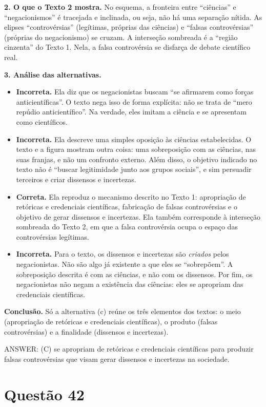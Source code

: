 \documentclass{article}%
\begin{document}
\textbf{2. O que o Texto 2 mostra.} No esquema, a fronteira entre ``ciências'' e ``negacionismos'' é tracejada e inclinada, ou seja, não há uma separação nítida. As elipses ``controvérsias'' (legítimas, próprias das ciências) e ``falsas controvérsias'' (próprias do negacionismo) se cruzam. A interseção sombreada é a ``região cinzenta'' do Texto 1. Nela, a falsa controvérsia se disfarça de debate científico real.

\textbf{3. Análise das alternativas.}
\begin{itemize}
  \item[(a)] \textbf{Incorreta.} Ela diz que os negacionistas buscam ``se afirmarem como forças anticientíficas''. O texto nega isso de forma explícita: não se trata de ``mero repúdio anticientífico''. Na verdade, eles imitam a ciência e se apresentam como científicos.
  \item[(b)] \textbf{Incorreta.} Ela descreve uma simples oposição às ciências estabelecidas. O texto e a figura mostram outra coisa: uma sobreposição com as ciências, nas suas franjas, e não um confronto externo. Além disso, o objetivo indicado no texto não é ``buscar legitimidade junto aos grupos sociais'', e sim persuadir terceiros e criar dissensos e incertezas.
  \item[(c)] \textbf{Correta.} Ela reproduz o mecanismo descrito no Texto 1: apropriação de retóricas e credenciais científicas, fabricação de falsas controvérsias e o objetivo de gerar dissensos e incertezas. Ela também corresponde à interseção sombreada do Texto 2, em que a falsa controvérsia ocupa o espaço das controvérsias legítimas.
  \item[(d)] \textbf{Incorreta.} Para o texto, os dissensos e incertezas são \emph{criados} pelos negacionistas. Não são algo já existente a que eles se ``sobrepõem''. A sobreposição descrita é com as ciências, e não com os dissensos. Por fim, os negacionistas não negam a existência das ciências: eles se apropriam das credenciais científicas.
\end{itemize}

\textbf{Conclusão.} Só a alternativa (c) reúne os três elementos dos textos: o meio (apropriação de retóricas e credenciais científicas), o produto (falsas controvérsias) e a finalidade (dissensos e incertezas).

ANSWER: (C) se apropriam de retóricas e credenciais científicas para produzir falsas controvérsias que visam gerar dissensos e incertezas na sociedade.%
\newpage%
\section*{Questão 42}
\end{document}
